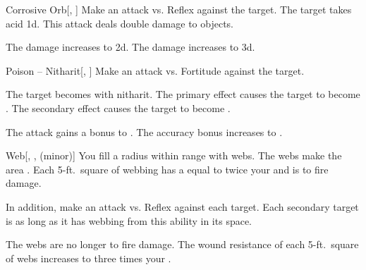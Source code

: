 \lowercase{\hypertarget{spell:Corrosive Orb}{}}\label{spell:Corrosive Orb}
\begin{freeability}[Rank 3]{\hypertarget{spell:Corrosive Orb}{Corrosive Orb}}[, ]
Make an attack vs. Reflex against the target.
\hit The target takes acid  \plus1d.
This attack deals double damage to objects.

\rankline
{} The damage increases to  \plus2d.
 The damage increases to  \plus3d.
\end{freeability}
\vspace{0.25em}



\lowercase{\hypertarget{spell:Poison -- Nitharit}{}}\label{spell:Poison -- Nitharit}
\begin{freeability}[Rank 3]{\hypertarget{spell:Poison -- Nitharit}{Poison -- Nitharit}}[, ]
Make an attack vs. Fortitude against the target.

\hit The target becomes  with nitharit.
The primary effect causes the target to become .
The secondary effect causes the target to become .

\rankline
{} The attack gains a  bonus to .
 The accuracy bonus increases to .
\end{freeability}
\vspace{0.25em}



\lowercase{\hypertarget{spell:Web}{}}\label{spell:Web}
\begin{freeability}[Rank 3]{\hypertarget{spell:Web}{Web}}[, ,  (minor)]
You fill a \areasmall radius  within \rngclose range with webs.
The webs make the area .
Each 5-ft.\ square of webbing has a  equal to twice your  and is  to fire damage.

In addition, make an attack vs. Reflex against each target.
\hit Each secondary target is  as long as it has webbing from this ability in its space.

\rankline
{} The webs are no longer  to fire damage.
 The wound resistance of each 5-ft.\ square of webs increases to three times your .
\end{freeability}
\vspace{0.25em}



